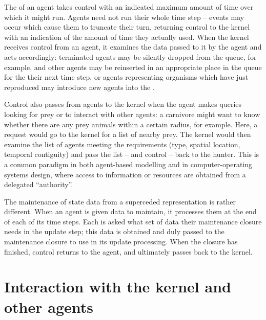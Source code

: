 The  of an agent takes control with an indicated
maximum amount of time over which it might run.  Agents need not run
their whole time step -- events may occur which cause them to truncate
their turn, returning control to the kernel with an indication of the
amount of time they actually used.  When the kernel receives control
from an agent, it examines the data passed to it by the agent and acts
accordingly: terminated agents may be silently dropped from the queue,
for example, and other agents may be reinserted in an appropriate
place in the queue for the their next time step, or agents
representing organisms which have just reproduced may introduce new
agents into the .

Control also passes from agents to the kernel when the agent makes
queries looking for prey or to interact with other agents: a carnivore
might want to know whether there are any prey animals within a certain
radius, for example.  Here, a request would go to the kernel for a
list of nearby prey.  The kernel would then examine the list of agents
meeting the requirements (type, spatial location, temporal contiguity)
and pass the list -- and control -- back to the hunter.  This is a
common paradigm in both agent-based modelling and in
computer-operating systems design, where access to information or
resources are obtained from a delegated ``authority''.

The maintenance of state data from a superceded representation is
rather different. When an agent is given data to maintain, it
processes them at the end of each of its time steps. Each is asked
what set of data their maintenance closure needs in the update step;
this data is obtained and duly passed to the maintenance closure to
use in its update processing.  When the closure has finished, control
returns to the agent, and ultimately passes back to the kernel.


\section{Interaction with the kernel and other agents}
